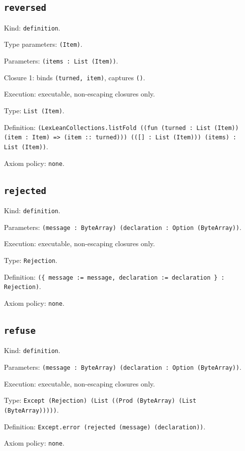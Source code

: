 \documentclass[11pt]{article}
\begin{document}
\subsection*{\texttt{reversed}}
\noindent Kind: \texttt{definition}.\par
\noindent Type parameters: \texttt{(Item)}.\par
\noindent Parameters: \texttt{(items : List (Item))}.\par
\noindent Closure 1: binds \texttt{(turned, item)}, captures \texttt{()}.\par
\noindent Execution: executable, non-escaping closures only.\par
\noindent Type: \texttt{List (Item)}.\par
\noindent Definition: \texttt{(LexLeanCollections.listFold ((fun (turned : List (Item)) (item : Item) => (item :: turned))) (([] : List (Item))) (items) : List (Item))}.\par
\noindent Axiom policy: \texttt{none}.\par
\subsection*{\texttt{rejected}}
\noindent Kind: \texttt{definition}.\par
\noindent Parameters: \texttt{(message : ByteArray) (declaration : Option (ByteArray))}.\par
\noindent Execution: executable, non-escaping closures only.\par
\noindent Type: \texttt{Rejection}.\par
\noindent Definition: \texttt{(\{ message := message, declaration := declaration \} : Rejection)}.\par
\noindent Axiom policy: \texttt{none}.\par
\subsection*{\texttt{refuse}}
\noindent Kind: \texttt{definition}.\par
\noindent Parameters: \texttt{(message : ByteArray) (declaration : Option (ByteArray))}.\par
\noindent Execution: executable, non-escaping closures only.\par
\noindent Type: \texttt{Except (Rejection) (List ((Prod (ByteArray) (List (ByteArray)))))}.\par
\noindent Definition: \texttt{Except.error (rejected (message) (declaration))}.\par
\noindent Axiom policy: \texttt{none}.\par
\end{document}
